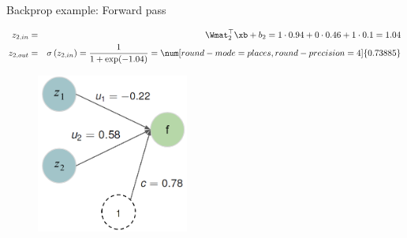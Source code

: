 \begin{vbframe}{Backprop example: Forward pass}
  \begin{figure}
    \centering
  \end{figure}
\vspace*{-0.5cm}
  \begin{footnotesize}
    \begin{eqnarray*}
    z_{2,in} &=& \Wmat_2^\top \xb + b_2 = 1 \cdot 0.94 + 0 \cdot 0.46 + 1 \cdot 0.1 = 1.04 \\
    z_{2,out} &=& \sigma\left(z_{2,in}\right) = \frac{1}{1+\exp(-1.04)} = \num[round-mode=places,round-precision=4]{0.73885}
    \end{eqnarray*}
  \end{footnotesize}
\framebreak

  \begin{figure}
    \centering
      \includegraphics[width=5cm]{../plots/forwardprop4b_new.png}
  \end{figure}


\end{vbframe}
